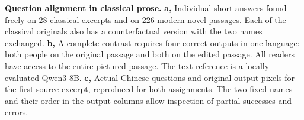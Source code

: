 \textbf{Question alignment in classical prose.}
\textbf{a,} Individual short answers found freely on 28 classical excerpts and on 226 modern novel passages. Each of the classical originals also has a counterfactual version with the two names exchanged. \textbf{b,} A complete contrast requires four correct outputs in one language: both people on the original passage and both on the edited passage. All readers have access to the entire pictured passage. The text reference is a locally evaluated Qwen3-8B. \textbf{c,} Actual Chinese questions and original output pixels for the first source excerpt, reproduced for both assignments. The two fixed names and their order in the output columns allow inspection of partial successes and errors.
